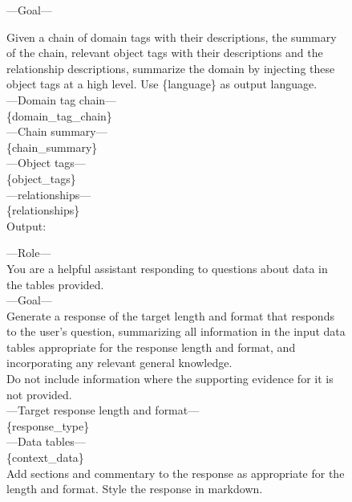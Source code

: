 \documentclass[11pt]{article}
\begin{document}
\begin{figure}[h]
\centering
\small
\begin{tcolorbox}[title=Prompt of domain-centric knowledge fusion, colframe=gray, colback=white]
    ---Goal---
    
    Given a chain of domain tags with their descriptions, the summary of the chain, relevant object tags with their descriptions and the relationship descriptions, summarize the domain by injecting these object tags at a high level.
    Use \{language\} as output language. \\
    ---Domain tag chain--- \\
    \{domain\_tag\_chain\} \\
    ---Chain summary--- \\
    \{chain\_summary\} \\
    ---Object tags--- \\
    \{object\_tags\} \\
    ---relationships--- \\
    \{relationships\} \\
    Output:
\end{tcolorbox}
\end{figure}




\begin{figure}[h]
\centering
\small
\begin{tcolorbox}[title=Prompt of tag knowledge-fused generation, colframe=gray, colback=white]
    ---Role--- \\
    You are a helpful assistant responding to questions about data in the tables provided. \\
    
    ---Goal--- \\
    Generate a response of the target length and format that responds to the user's question, summarizing all information in the input data tables appropriate for the response length and format, and incorporating any relevant general knowledge. \\
    Do not include information where the supporting evidence for it is not provided. \\
    
    ---Target response length and format--- \\
    \{response\_type\} \\
    ---Data tables--- \\
    \{context\_data\} \\
    
    Add sections and commentary to the response as appropriate for the length and format. Style the response in markdown.
\end{tcolorbox}
\end{figure}
\end{document}
